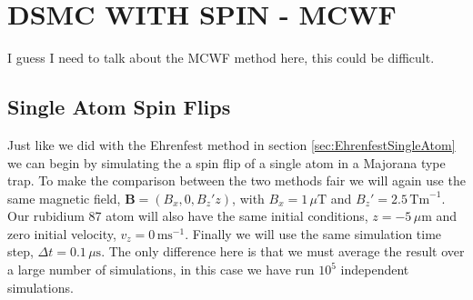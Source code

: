 
\chapter{DSMC WITH SPIN - MCWF} %

\label{ch:dsmcmcwf} %

I guess I need to talk about the MCWF method here, this could be difficult.

\section{Single Atom Spin Flips}

Just like we did with the Ehrenfest method in section \ref{sec:EhrenfestSingleAtom} we can begin by simulating the a spin flip of a single atom in a Majorana type trap. 
To make the comparison between the two methods fair we will again use the same magnetic field, $\mathbf{B} = (B_x,0,B_z'z)$, with $B_x=1\,\mu\mathrm{T}$ and $B_z'=2.5\,\mathrm{Tm}^{-1}$.
Our rubidium 87 atom will also have the same initial conditions, $z=-5\,\mu\mathrm{m}$ and zero initial velocity, $v_z=0\,\mathrm{ms}^{-1}$.
Finally we will use the same simulation time step, $\Delta t = 0.1\,\mu\mathrm{s}$.
The only difference here is that we must average the result over a large number of simulations, in this case we have run $10^5$ independent simulations.

